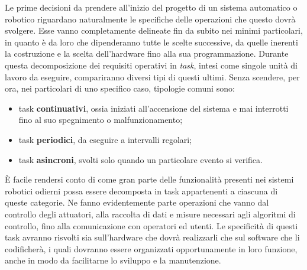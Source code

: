 \indent Le prime decisioni da prendere all'inizio del progetto di un sistema automatico o robotico riguardano naturalmente le specifiche delle operazioni che questo dovrà svolgere. Esse vanno completamente delineate fin da subito nei minimi particolari, in quanto è da loro che dipenderanno tutte le scelte successive, da quelle inerenti la costruzione e la scelta dell'hardware fino alla sua programmazione. Durante questa decomposizione dei requisiti operativi in \emph{task}, intesi come singole unità di lavoro da eseguire, compariranno diversi tipi di questi ultimi. Senza scendere, per ora, nei particolari di uno specifico caso, tipologie comuni sono:
\begin{itemize}
    \item task \textbf{continuativi}, ossia iniziati all'accensione del sistema e mai interrotti fino al suo spegnimento o malfunzionamento;
    \item task \textbf{periodici}, da eseguire a intervalli regolari;
    \item task \textbf{asincroni}, svolti solo quando un particolare evento si verifica.
\end{itemize}
È facile rendersi conto di come gran parte delle funzionalità presenti nei sistemi robotici odierni possa essere decomposta in task appartenenti a ciascuna di queste categorie. Ne fanno evidentemente parte operazioni che vanno dal controllo degli attuatori, alla raccolta di dati e misure necessari agli algoritmi di controllo, fino alla comunicazione con operatori ed utenti. Le specificità di questi task avranno risvolti sia sull'hardware che dovrà realizzarli che sul software che li codificherà, i quali dovranno essere organizzati opportunamente in loro funzione, anche in modo da facilitarne lo sviluppo e la manutenzione.

